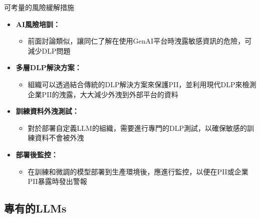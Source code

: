 \documentclass[aspectratio=1610]{Common/MyCourseBeamer}
\begin{document}
\begin{frame}[allowframebreaks]{可考量的風險緩解措施}
	
	\begin{itemize}
		\item \textbf{AI風險培訓：} 
			\begin{itemize}
				\item 前面討論類似，讓同仁了解在使用GenAI平台時洩露敏感資訊的危險，可減少DLP問題
			\end{itemize}
		
		\item \textbf{多層DLP解決方案：}
			\begin{itemize}
				\item 組織可以透過結合傳統的DLP解決方案來保護PII，並利用現代DLP來檢測企業PII的洩露，大大減少外洩到外部平台的資料
			\end{itemize}
		 
		
		\item \textbf{訓練資料外洩測試：} 
			\begin{itemize}
				\item 對於部署自定義LLM的組織，需要進行專門的DLP測試，以確保敏感的訓練資料不會被外洩 
			\end{itemize}
		
		\item \textbf{部署後監控：} 
			\begin{itemize}
				\item 在訓練和微調的模型部署到生產環境後，應進行監控，以便在PII或企業PII暴露時發出警報
			\end{itemize}
	\end{itemize}
	
\end{frame}

\subsection{專有的LLMs}
\end{document}
